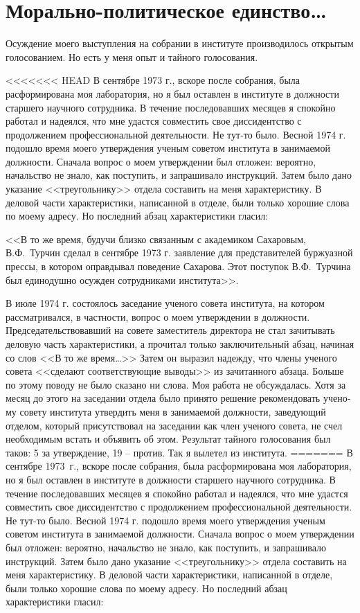 \documentclass{book}
\begin{document}
\section{Морально-политическое единство\ldots}


Осуждение моего выступления на собрании в институте производилось открытым голосованием. Но есть у меня опыт и тайного голосования.

<<<<<<< HEAD
В сентябре 1973 г., вскоре после собрания, была расформиро­вана моя лаборатория, но я был оставлен в институте в долж­ности старшего научного сотрудника. В течение последовавших месяцев я спокойно работал и надеялся, что мне удастся совместить свое диссидентство с продолжением профессиональ­ной деятельности. Не тут‑то было. Весной 1974 г. подошло время моего утверждения ученым советом института в занима­емой должности. Сначала вопрос о моем утверждении был от­ложен: вероятно, начальство не знало, как поступить, и запра­шивало инструкций. Затем было дано указание <<треугольнику>> отдела составить на меня характеристику.
В деловой части характеристики, написанной в отделе, были только хорошие слова по моему адресу. Но последний абзац характеристики гласил:

<<В то же время, будучи близко связанным с академиком Сахаровым, В.Ф.~Турчин сделал в сентябре 1973 г. заявление для представителей буржуазной прессы, в котором оправды­вал поведение Сахарова. Этот поступок В.Ф.~Турчина был еди­нодушно осужден сотрудниками института>>.

В июле 1974 г. состоялось заседание ученого совета инсти­тута, на котором рассматривался, в частности, вопрос о моем утверждении в должности. Председательствовавший на совете заместитель директора не стал зачитывать деловую часть харак­теристики, а прочитал только заключительный абзац, начиная со слов <<В то же время\ldots>> Затем он выразил надежду, что члены ученого совета <<сделают соответствующие выводы>> из зачи­танного абзаца. Больше по этому поводу не было сказано ни слова. Моя работа не обсуждалась. Хотя за месяц до этого на заседании отдела было принято решение рекомендовать учено­му совету института утвердить меня в занимаемой должности, заведующий отделом, который присутствовал на заседании как член ученого совета, не счел необходимым встать и объя­вить об этом. Результат тайного голосования был таков: 5 за утверждение, 19 -- против. Так я вылетел из института.
=======
В сентябре 1973~г., вскоре после собрания, была расформиро­вана моя лаборатория, но я был оставлен в институте в долж­ности старшего научного сотрудника. В течение последовавших месяцев я спокойно работал и надеялся, что мне удастся совместить свое диссидентство с продолжением профессиональ­ной деятельности. Не тут-то было. Весной 1974 г. подошло время моего утверждения ученым советом института в занима­емой должности. Сначала вопрос о моем утверждении был от­ложен: вероятно, начальство не знало, как поступить, и запра­шивало инструкций. Затем было дано указание <<треугольнику>> отдела составить на меня характеристику.
В деловой части характеристики, написанной в отделе, были только хорошие слова по моему адресу. Но последний абзац характеристики гласил:
\end{document}
